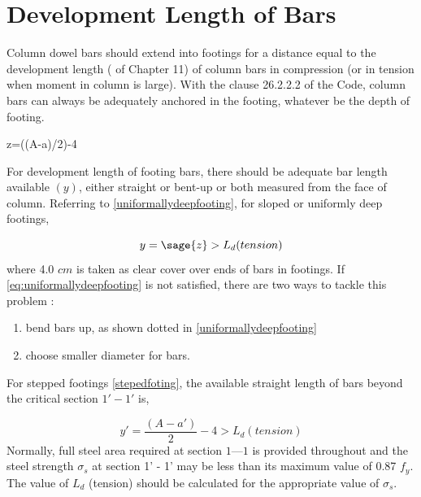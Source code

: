 \section{Development Length of Bars}
Column dowel bars should extend into footings for a distance equal to the development
length ( of Chapter 11) of column bars in compression (or in tension when moment in column is large). With the clause 26.2.2.2 of the Code, column bars can always be adequately anchored in the footing, whatever be the depth of footing. 

\begin{sagesilent}
        z=((A-a)/2)-4                    
\end{sagesilent}

For development length of footing bars, there should be adequate bar length available $(y)$, either straight or bent-up or both measured from the face of column. Referring to \figmacro\ref{uniformallydeepfooting}, for sloped or uniformly deep footings,

\begin{equation} 
        \label{eq:uniformallydeepfooting}
        y= \sage{z} >L_d (tension)
\end{equation}
where 4.0 $cm$ is taken as clear cover over ends of bars in footings. If \equmacro \ref{eq:uniformallydeepfooting} is not  satisfied, there are two ways to tackle this problem :

\begin{enumerate}
\item bend bars up, as shown dotted in \figmacro \ref{uniformallydeepfooting}
\item choose smaller diameter for bars.
\end{enumerate}

For stepped footings \figmacro \ref{stepedfoting}, the available straight length of bars beyond the critical
section ${1' - 1'}$ is,
                                                          
\begin{equation}                                                           \label{eq:criticalsection1-1}
        y'= \frac{(A-a')}{2}-4 >L_d (tension)                                      
\end{equation}
Normally, full steel area required at section $1 — 1$ is provided throughout and the steel strength $\sigma_s$ at section 1’ - 1’ may be less than its maximum value of 0.87 $f_y$. The value of $L_d$ (tension) should be calculated for the appropriate value of $\sigma_s$.

